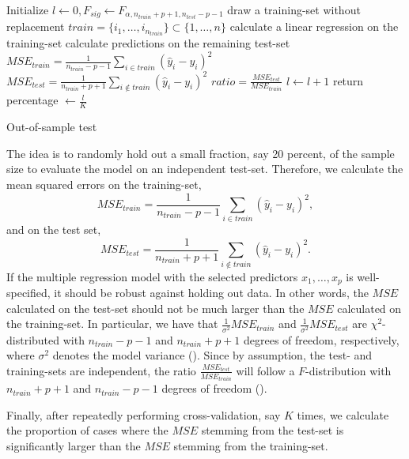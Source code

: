 \documentclass[a4paper, 11pt]{scrreprt}
\begin{document}
\begin{algorithm} 

Initialize $l \gets 0, F_{sig} \gets F_{\alpha, n_{train} + p + 1, n_{test} - p - 1}$ \;
	{
		draw a training-set without replacement $train = \{ i_1,\ldots,i_{n_{train}} \} \subset \{ 1,\ldots,n \}$ \;
		calculate a linear regression on the training-set \;
		calculate predictions on the remaining test-set \;
		$MSE_{train} = \frac{1}{n_{train} - p - 1} \sum_{i \in train} (\hat{y}_{i} - y_{i})^2 $ \;
		$MSE_{test} = \frac{1}{n_{train} + p + 1} \sum_{i \notin train} (\hat{y}_i - y_i)^2 $\;
		$ratio = \frac{MSE_{test}}{MSE_{train}}$ \;
		   {
		   $l \gets l+1$	\; 
		   }
	}
return percentage $\gets \frac{l}{K}$\;
\caption{Out-of-sample test}
\label{algo:outofsampletest}
\end{algorithm}

The idea is to randomly hold out a small fraction, say 20 percent, of the sample size to evaluate the model on an independent test-set. Therefore, we calculate the mean squared errors on the training-set,
\[ 
MSE_{train} = \frac{1}{n_{train} - p - 1} \sum_{i \in train} (\hat{y}_{i} - y_{i})^2,
\]
and on the test set,
\[ 
MSE_{test} = \frac{1}{n_{train} + p + 1} \sum_{i \notin train} (\hat{y}_i - y_i)^2.
\]
If the multiple regression model with the selected predictors $x_1, \ldots, x_p$ is well-specified, it should be robust against holding out data. In other words, the $MSE$ calculated on the test-set should not be much larger than the $MSE$ calculated on the training-set. In particular, we have that $\frac{1}{\sigma^2} MSE_{train}$ and $\frac{1}{\sigma^2} MSE_{test}$ are $\chi^2$-distributed with $n_{train}-p-1$ and $n_{train}+p+1$ degrees of freedom, respectively, where $\sigma^2$ denotes the model variance (\textcite{trippa2015bayesian}).
Since by assumption, the test- and training-sets are independent, the ratio $\frac{MSE_{test}}{MSE_{train}}$ will follow a $F$-distribution with $n_{train} + p + 1$ and $n_{train}-p-1$ degrees of freedom (\textcite[chapter 9.7]{degroot2014probability}).

Finally, after repeatedly performing cross-validation, say $K$ times, we calculate the proportion of cases where the $MSE$ stemming from the test-set is significantly larger than the $MSE$ stemming from the training-set.
\end{document}
